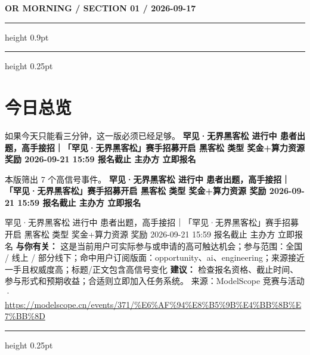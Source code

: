 \documentclass[10.5pt]{ctexart}
\begin{document}
{\small\bfseries OR MORNING / SECTION 01 / 2026-09-17}
\vspace{2mm}
\hrule height 0.9pt
\vspace{1.5mm}
\hrule height 0.25pt
\vspace{4mm}
\section*{今日总览}
{\color{ormuted} 如果今天只能看三分钟，这一版必须已经足够。}
\vspace{2mm}
{\fontsize{25}{29}\selectfont\bfseries 罕见·无界黑客松 进行中 患者出题，高手接招｜「罕见·无界黑客松」赛手招募开启 黑客松 类型 奖金+算力资源 奖励 2026-09-21 15:59 报名截止 主办方 立即报名}\par
\vspace{2mm}
{\large 本版筛出 7 个高信号事件。}
\vspace{3mm}
{\Large\bfseries 罕见·无界黑客松 进行中 患者出题，高手接招｜「罕见·无界黑客松」赛手招募开启 黑客松 类型 奖金+算力资源 奖励 2026-09-21 15:59 报名截止 主办方 立即报名}\par
罕见·无界黑客松 进行中 患者出题，高手接招｜「罕见·无界黑客松」赛手招募开启 黑客松 类型 奖金+算力资源 奖励 2026-09-21 15:59 报名截止 主办方 立即报名
\textbf{与你有关：} 这是当前用户可实际参与或申请的高可触达机会；参与范围：全国 / 线上 / 部分线下；命中用户订阅版面：opportunity、ai、engineering；来源接近一手且权威度高；标题/正文包含高信号变化
\textbf{建议：} 检查报名资格、截止时间、参与形式和预期收益；合适则立即加入任务系统。
{\footnotesize\color{ormuted} 来源：ModelScope 竞赛与活动 · \url{https://modelscope.cn/events/371/%E6%AF%94%E8%B5%9B%E4%BB%8B%E7%BB%8D}}
\vspace{3mm}
\hrule height 0.25pt
\vspace{3mm}
\end{document}
